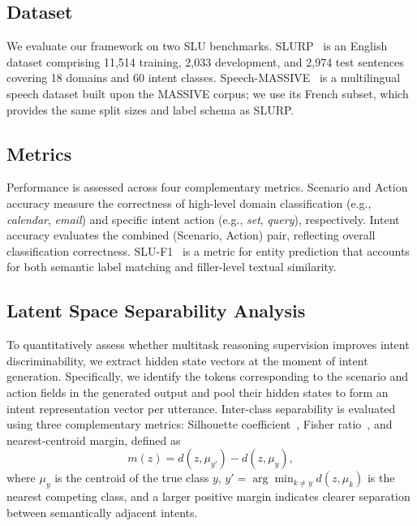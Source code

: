 \documentclass[cameraready]{Interspeech}
\begin{document}
\subsection{Dataset}
We evaluate our framework on two SLU benchmarks.
SLURP~\cite{bastianelli-etal-2020-slurp} is an English dataset
comprising 11,514 training, 2,033 development, and 2,974 test
sentences covering 18 domains and 60 intent classes.
Speech-MASSIVE~\cite{lee2024speechmassivemultilingualspeechdataset}
is a multilingual speech dataset built upon the MASSIVE
corpus; we use its French subset, which provides the same
split sizes and label schema as SLURP.



\subsection{Metrics}
Performance is assessed across four complementary metrics.
Scenario and Action accuracy measure the correctness of
high-level domain classification (e.g., \textit{calendar},
\textit{email}) and specific intent action (e.g., \textit{set},
\textit{query}), respectively. Intent accuracy evaluates the
combined (Scenario, Action) pair, reflecting overall
classification correctness. SLU-F1~\cite{bastianelli-etal-2020-slurp} is a metric for
entity prediction that accounts for both semantic label
matching and filler-level textual similarity.


\subsection{Latent Space Separability Analysis}
\label{sec:rep_analysis}
To quantitatively assess whether multitask reasoning supervision improves intent discriminability, we extract hidden state vectors at the moment of intent generation.
Specifically, we identify the tokens corresponding to the scenario and action fields in the generated output and pool their hidden states to form an intent representation vector per utterance.
Inter-class separability is evaluated using three complementary metrics: Silhouette coefficient~\cite{ROUSSEEUW198753}, Fisher ratio~\cite{fisher1936use}, and nearest-centroid margin, defined as
\begin{equation}
  m(z) = d(z, \mu_{y'}) - d(z, \mu_{y}),
  \label{eq:ncm}
\end{equation}
where $\mu_y$ is the centroid of the true class $y$, $y' = \arg\min_{k \neq y} d(z, \mu_k)$ is the nearest competing class, and a larger positive margin indicates clearer separation between semantically adjacent intents.
\end{document}
